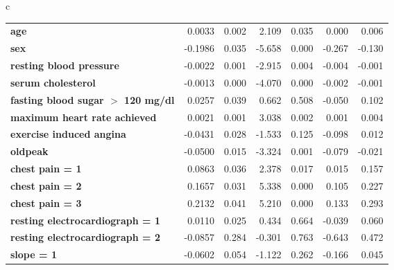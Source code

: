 \begin{table*}[!tp]
{{\begin{tabular}{c}
\begin{tabular*}{\textwidth}{l @{\extracolsep{\fill}} rrrrrr}
\textbf{age}                               &       0.0033   &        0.002     &     2.109  &         0.035        &        0.000    &        0.006     \\
\textbf{sex}                               &      -0.1986   &        0.035     &    -5.658  &         0.000        &       -0.267    &       -0.130     \\
\textbf{resting blood pressure}            &      -0.0022   &        0.001     &    -2.915  &         0.004        &       -0.004    &       -0.001     \\
\textbf{serum cholesterol}                 &      -0.0013   &        0.000     &    -4.070  &         0.000        &       -0.002    &       -0.001     \\
\textbf{fasting blood sugar $>$ 120 mg/dl} &       0.0257   &        0.039     &     0.662  &         0.508        &       -0.050    &        0.102     \\
\textbf{maximum heart rate achieved}       &       0.0021   &        0.001     &     3.038  &         0.002        &        0.001    &        0.004     \\
\textbf{exercise induced angina}           &      -0.0431   &        0.028     &    -1.533  &         0.125        &       -0.098    &        0.012     \\
\textbf{oldpeak}                           &      -0.0500   &        0.015     &    -3.324  &         0.001        &       -0.079    &       -0.021     \\
\textbf{chest pain = 1}                    &       0.0863   &        0.036     &     2.378  &         0.017        &        0.015    &        0.157     \\
\textbf{chest pain = 2}                    &       0.1657   &        0.031     &     5.338  &         0.000        &        0.105    &        0.227     \\
\textbf{chest pain = 3}                    &       0.2132   &        0.041     &     5.210  &         0.000        &        0.133    &        0.293     \\
\textbf{resting electrocardiograph = 1}    &       0.0110   &        0.025     &     0.434  &         0.664        &       -0.039    &        0.060     \\
\textbf{resting electrocardiograph = 2}    &      -0.0857   &        0.284     &    -0.301  &         0.763        &       -0.643    &        0.472     \\
\textbf{slope = 1}                         &      -0.0602   &        0.054     &    -1.122  &         0.262        &       -0.166    &        0.045     \\

\end{tabular*}
\end{tabular}}}
\end{table*}
